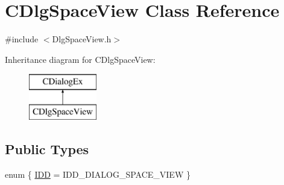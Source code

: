 \hypertarget{class_c_dlg_space_view}{}\section{C\+Dlg\+Space\+View Class Reference}
\label{class_c_dlg_space_view}


{\ttfamily \#include $<$Dlg\+Space\+View.\+h$>$}

Inheritance diagram for C\+Dlg\+Space\+View\+:\begin{figure}[H]
\begin{center}
\leavevmode
\includegraphics[height=2.000000cm]{class_c_dlg_space_view}
\end{center}
\end{figure}
\subsection*{Public Types}
\begin{DoxyCompactItemize}
\item 
enum \{ \hyperlink{class_c_dlg_space_view_aa1d599418cc773fe475c1265a6a19274a883ade28e126068686c7a9417977b146}{I\+D\+D} = I\+D\+D\+\_\+\+D\+I\+A\+L\+O\+G\+\_\+\+S\+P\+A\+C\+E\+\_\+\+V\+I\+E\+W
 \}
\end{DoxyCompactItemize}
